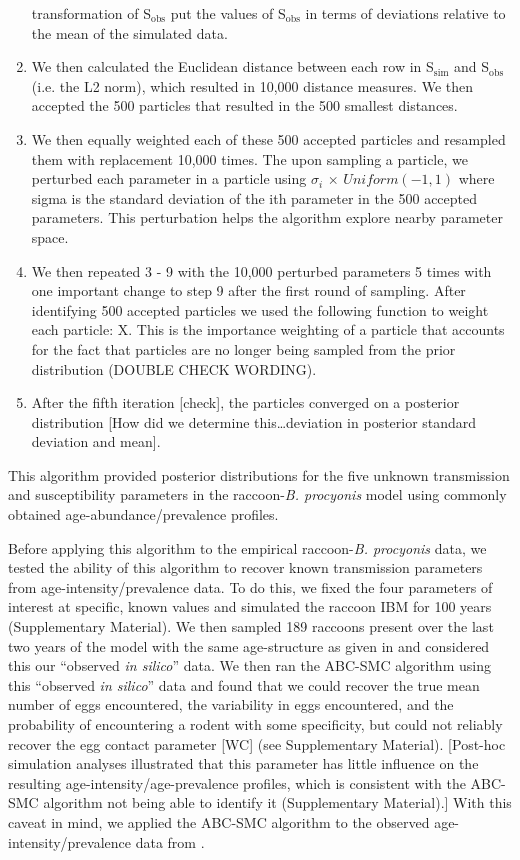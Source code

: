 \documentclass[11pt]{article}
\begin{document}
\begin{enumerate}
  transformation of S$_\text{obs}$ put the values of S$_\text{obs}$ in terms of
  deviations relative to the mean of the simulated data.
\item
  We then calculated the Euclidean distance between each row in S$_\text{sim}$
  and S$_\text{obs}$ (i.e. the L2 norm), which resulted in 10,000 distance
  measures. We then accepted the 500 particles that resulted in the
  500 smallest distances.
\item
  We then equally weighted each of these 500 accepted particles and
  resampled them with replacement 10,000 times. The upon sampling a
  particle, we perturbed each parameter in a particle using
 $\sigma_i$ $\times$ $Uniform(-1, 1)$ where sigma is the standard
  deviation of the ith parameter in the 500 accepted parameters. This
  perturbation helps the algorithm explore nearby parameter space.
\item
  We then repeated 3 - 9 with the 10,000 perturbed parameters 5
  times with one important change to step 9 after the first round of
  sampling. After identifying 500 accepted particles we used the
  following function to weight each particle: X. This is the
  importance weighting of a particle that accounts for the fact that
  particles are no longer being sampled from the prior distribution \citep{Beaumont2010}
  (DOUBLE CHECK WORDING).
\item
  After the fifth iteration {[}check{]}, the particles converged on a
  posterior distribution {[}How did we determine this\ldots{}deviation
  in posterior standard deviation and mean{]}.
\end{enumerate}

This algorithm provided posterior distributions for the five unknown
transmission and susceptibility parameters in the raccoon-\emph{B.
procyonis} model using commonly obtained age-abundance/prevalence
profiles.  

Before applying this algorithm to the empirical raccoon-\emph{B. procyonis} data, we tested the ability of this algorithm to recover known transmission parameters from age-intensity/prevalence data.  To do this, we fixed the four parameters of interest at specific, known values and simulated the raccoon IBM for 100 years (Supplementary Material).  We then sampled 189 raccoons present over the last two years of the model with the same age-structure as given in \cite{Weinstein2016} and considered this our ``observed \emph{in silico}'' data.  We then ran the ABC-SMC algorithm using this ``observed \emph{in silico}'' data and found that we could recover the true mean number of eggs encountered, the variability in eggs encountered, and the probability of encountering a rodent with some specificity, but could not reliably recover the egg contact parameter [WC] (see Supplementary Material). [Post-hoc simulation analyses illustrated that this parameter has little influence on the resulting age-intensity/age-prevalence profiles, which is consistent with the ABC-SMC algorithm not being able to identify it (Supplementary Material).] With this caveat in mind, we applied the ABC-SMC algorithm to the observed age-intensity/prevalence data from \cite{Weinstein2016}.
\end{document}
